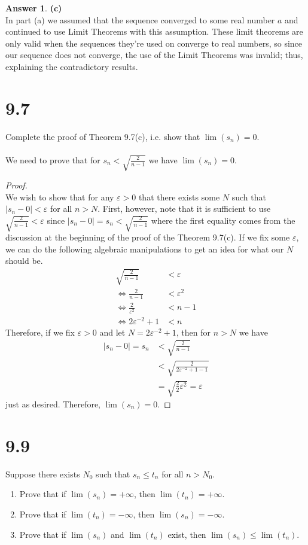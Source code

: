 \documentclass[10pt,a4paper]{article}
\theoremstyle{definition}
\newtheorem*{answer*}{Answer}
\begin{document}
\begin{answer*}{\textbf{(c)}}
\\In part (a) we assumed that the sequence converged to some real number $a$ and continued to use Limit Theorems with this assumption. These limit theorems are only valid when the sequences they're used on converge to real numbers, so since our sequence does not converge, the use of the Limit Theorems was invalid; thus, explaining the contradictory results. 
\end{answer*}

\section*{9.7}
Complete the proof of Theorem 9.7(c), i.e. show that $\lim(s_n) = 0$.\\
\\We need to prove that for $s_n < \sqrt{\frac{2}{n-1}}$ we have $\lim(s_n) = 0$.
\begin{proof}{$ $}
\\We wish to show that for any $\varepsilon > 0$ that there exists some $N$ such that $|s_n - 0| < \varepsilon$ for all $n > N$. First, however, note that it is sufficient to use $\sqrt{\frac{2}{n-1}} < \varepsilon$ since $|s_n - 0| = s_n < \sqrt{\frac{2}{n-1}}$ where the first equality comes from the discussion at the beginning of the proof of the Theorem 9.7(c). If we fix some $\varepsilon$, we can do the following algebraic manipulations to get an idea for what our $N$ should be. 
\begin{align*}
\sqrt{\frac{2}{n-1}} &< \varepsilon\\
\iff \frac{2}{n-1} &< \varepsilon^2\\
\iff \frac{2}{\varepsilon^2} &< n-1\\
\iff 2\varepsilon^{-2} + 1 &< n
\end{align*}
Therefore, if we fix $\varepsilon>0$ and let $N = 2\varepsilon^{-2} + 1$, then for $n > N$ we have 
\begin{align*}
|s_n - 0| = s_n &< \sqrt{\frac{2}{n - 1}}\\
&< \sqrt{\frac{2}{2\varepsilon^{-2} + 1 - 1}}\\
&= \sqrt{\frac{2}{2}\varepsilon^2} = \varepsilon
\end{align*}
just as desired. Therefore, $\lim(s_n) = 0$.
\end{proof}

\section*{9.9}
Suppose there exists $N_0$ such that $s_n \leq t_n$ for all $n > N_0$. 
\begin{enumerate}[label = (\alph*)]
\item Prove that if $\lim(s_n) = +\infty$, then $\lim(t_n) = +\infty$.
\item Prove that if $\lim(t_n) = -\infty$, then $\lim(s_n) = -\infty$. 
\item Prove that if $\lim(s_n)$ and $\lim(t_n)$ exist, then $\lim(s_n) \leq \lim(t_n)$.
\end{enumerate}
\end{document}
